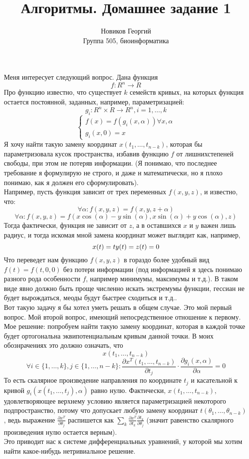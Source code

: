 \documentclass[12pt]{article}
\title{Алгоритмы. Домашнее задание 1}
\author{Новиков Георгий \\ Группа 505, биоинформатика}
\begin{document}
\maketitle
Меня интересует следующий вопрос. Дана функция
$$f : R^n \rightarrow R$$
Про функцию известно, что существует $k$ семейств кривых, на которых функция остается постоянной, заданных, например, параметризацией:
$$g_i : R^n \times R \rightarrow R^n, i = 1, \dots, k$$
$$\begin{cases} f(x) = f(g_i(x, \alpha)) \forall x, \alpha \\ g_i(x, 0) = x\end{cases}$$
Я хочу найти такую замену координат $x(t_1, \dots, t_{n - k})$, которая бы параметризовала кусок пространства, избавив функцию $f$ от лишнихстепеней свободы, при этом не потеряв информации.
(Я понимаю, что последнее требование я формулирую не строго, и даже н математически, но я плохо понимаю, как я должен его сформулировать). \\
Например, пусть функция зависит от трех переменных $f(x, y, z)$, и известно, что:
$$\forall \alpha: f(x, y, z) = f(x, y, z + \alpha)$$
$$\forall \alpha: f(x, y, z) = f(x \cos(\alpha) - y \sin(\alpha), x \sin(\alpha) + y \cos(\alpha), z)$$
Тогда фактически, функция не зависит от $z$, а в оставшихся $x$ и $y$ важен лишь радиус, и тогда искомая мной замена координат может выглядит как, например,
$$x(t) = t \\ y(t) = z(t) = 0$$
Что переведет нам функцию $f(x, y, z)$ в гораздо более удобный вид $f(t) = f(t, 0, 0)$ без потери информации (под информацией я здесь понимаю разного рода особенности $f$, например минимумы, максимумы и т.д.). В таком виде явно должно быть проще численно искать экстремумы функции, гессиан не будет вырождаться, меоды будут быстрее сходиться и т.д.. \\
Вот такую задачу я бы хотел уметь решать в общем случае. Это мой первый вопрос. Мой второй вопрос, имеющий непосредственное отношение к первому. Мое решение: попробуем найти такую замену координат, которая в каждой точке будет ортогональна эквипотенциальным кривым данной точки. В моих обознрачениях это должно означать, что
$$x(t_1, \dots, t_{n - k})$$
$$\forall i \in \{1, \dots, k\}, j \in \{1, \dots, n - k\}: \frac{\partial{x^T(t_1, \dots, t_{n - k})}}{\partial{t_j}} \cdot \frac{\partial{g_i(x, \alpha)}}{\partial{\alpha}} = 0$$
То есть скалярное произведение направления по координате $t_j$ и касательной к кривой $g_i(x(t_1, \dots, t_j), \alpha)$ равно нулю. Фактически, $x(t_1, \dots, t_{n - k})$, удовлетворяющее верхнему условию является параметризацией некоторого подпространство, потому что допускает любую замену координат $t(\theta_1, \dots, \theta_{n - k})$, ведь выражение $\frac{\partial{x^T}}{\partial \theta_j}$ распишется как $\sum_k \frac{\partial{x^T}}{\partial t_k} \frac{\partial t_k}{\partial \theta_j}$ (значит равенство скалярного произведения нулю остается верным). \\
Это приводит нас к системе дифференциальных уравнений, у которой мы хотим найти какое-нибудь нетривиальное решение. 
\end{document}
